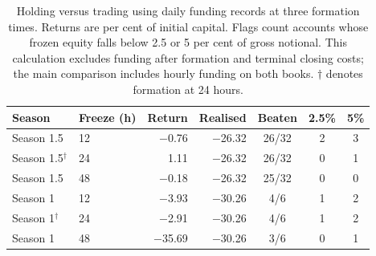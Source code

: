 \begin{table}[ht]
\centering
\small
\caption{Holding versus trading using daily funding records at three
formation times. Returns are per cent of initial capital. Flags count
accounts whose frozen equity falls below 2.5 or 5 per cent of gross
notional. This calculation excludes funding after formation and terminal
closing costs; the main comparison includes hourly funding on both books.
$\dagger$ denotes formation at 24 hours.}
\label{tab:freeze}
\begin{tabular}{llrrccc}
\toprule
Season & Freeze (h) & Return & Realised & Beaten & 2.5\% & 5\% \\
\midrule
Season 1.5 & 12 & $-$0.76 & $-$26.32 & 26/32 & 2 & 3 \\
Season 1.5$^{\dagger}$ & 24 & 1.11 & $-$26.32 & 26/32 & 0 & 1 \\
Season 1.5 & 48 & $-$0.18 & $-$26.32 & 25/32 & 0 & 0 \\
\midrule
Season 1 & 12 & $-$3.93 & $-$30.26 & 4/6 & 1 & 2 \\
Season 1$^{\dagger}$ & 24 & $-$2.91 & $-$30.26 & 4/6 & 1 & 2 \\
Season 1 & 48 & $-$35.69 & $-$30.26 & 3/6 & 0 & 1 \\
\bottomrule
\end{tabular}
\end{table}
